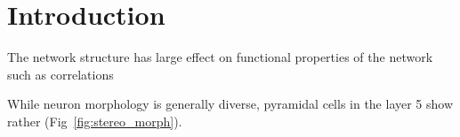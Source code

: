 \clearpage
\pagebreak
\newpage
\section*{Introduction}

The network structure has large effect on functional properties of the network such as correlations \cite{Pernice2011}








While neuron morphology is generally diverse, pyramidal cells in the layer 5 show rather  (Fig~\ref{fig:stereo_morph}). 






